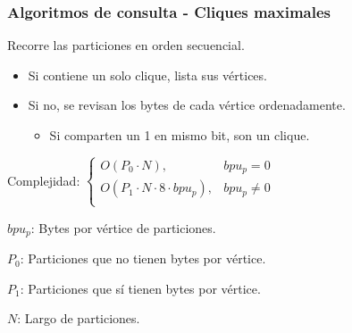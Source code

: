 \begin{frame}
\frametitle{Algoritmos de consulta - Cliques maximales}

Recorre las particiones en orden secuencial.
\begin{itemize}
	\item Si contiene un solo clique, lista sus vértices.
	\item Si no, se revisan los bytes de cada vértice ordenadamente.
	\begin{itemize}
		\footnotesize
		\item Si comparten un 1 en mismo bit, son un clique.
	\end{itemize}
\end{itemize}

\vspace{6mm}
Complejidad: 
$\begin{cases}
	O(P_{0} \cdot N), & bpu_{p} = 0 \\
	O(P_{1} \cdot N \cdot 8 \cdot bpu_{p}), & bpu_{p} \neq 0  \\
\end{cases}$

\vspace{3mm}
{\footnotesize
$bpu_{p}$: Bytes por vértice de particiones.

$P_{0}$: Particiones que no tienen bytes por vértice.

$P_{1}$: Particiones que sí tienen bytes por vértice.

$N$: Largo de particiones.
}

\end{frame}
